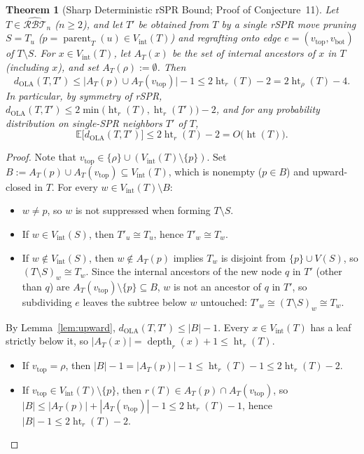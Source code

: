 \documentclass[11pt]{article}
\newtheorem{theorem}{Theorem}
\theoremstyle{definition}
\theoremstyle{remark}
\DeclareMathOperator{\htr}{ht}
\DeclareMathOperator{\parent}{parent}
\DeclareMathOperator{\depth}{depth}
\begin{document}
\begin{theorem}[Sharp Deterministic rSPR Bound; Proof of Conjecture~11]\label{thm:rspr}
Let $T \in \widehat{\mathcal{RBT}}_n$ ($n \ge 2$), and let $T'$ be obtained from $T$ by a single rSPR move pruning $S = T_u$ ($p = \parent_T(u) \in V_{\mathrm{int}}(T)$) and regrafting onto edge $e = (v_{\mathrm{top}}, v_{\mathrm{bot}})$ of $T \setminus S$. For $x \in V_{\mathrm{int}}(T)$, let $A_T(x)$ be the set of internal ancestors of $x$ in $T$ (including $x$), and set $A_T(\rho) := \emptyset$. Then
\[
  d_{\mathrm{OLA}}(T, T') \le \bigl|A_T(p) \cup A_T(v_{\mathrm{top}})\bigr| - 1 \le 2\htr_r(T) - 2 = 2\htr_\rho(T) - 4.
\]
In particular, by symmetry of rSPR, $d_{\mathrm{OLA}}(T, T') \le 2\min\bigl(\htr_r(T), \htr_r(T')\bigr) - 2$, and for any probability distribution on single-SPR neighbors $T'$ of $T$,
\[
  \mathbb{E}\bigl[d_{\mathrm{OLA}}(T, T')\bigr] \le 2\htr_r(T) - 2 = O\bigl(\htr(T)\bigr).
\]
\end{theorem}

\begin{proof}
Note that $v_{\mathrm{top}} \in \{\rho\} \cup (V_{\mathrm{int}}(T) \setminus \{p\})$. Set $B := A_T(p) \cup A_T(v_{\mathrm{top}}) \subseteq V_{\mathrm{int}}(T)$, which is nonempty ($p \in B$) and upward-closed in $T$. For every $w \in V_{\mathrm{int}}(T) \setminus B$:
\begin{itemize}[leftmargin=2em,itemsep=2pt]
  \item $w \neq p$, so $w$ is not suppressed when forming $T \setminus S$.
  \item If $w \in V_{\mathrm{int}}(S)$, then $T'_u \cong T_u$, hence $T'_w \cong T_w$.
  \item If $w \notin V_{\mathrm{int}}(S)$, then $w \notin A_T(p)$ implies $T_w$ is disjoint from $\{p\} \cup V(S)$, so $(T \setminus S)_w \cong T_w$. Since the internal ancestors of the new node $q$ in $T'$ (other than $q$) are $A_T(v_{\mathrm{top}}) \setminus \{p\} \subseteq B$, $w$ is not an ancestor of $q$ in $T'$, so subdividing $e$ leaves the subtree below $w$ untouched: $T'_w \cong (T \setminus S)_w \cong T_w$.
\end{itemize}
By Lemma~\ref{lem:upward}, $d_{\mathrm{OLA}}(T, T') \le |B| - 1$. Every $x \in V_{\mathrm{int}}(T)$ has a leaf strictly below it, so $|A_T(x)| = \depth_r(x) + 1 \le \htr_r(T)$.
\begin{itemize}[leftmargin=2em,itemsep=2pt]
  \item If $v_{\mathrm{top}} = \rho$, then $|B| - 1 = |A_T(p)| - 1 \le \htr_r(T) - 1 \le 2\htr_r(T) - 2$.
  \item If $v_{\mathrm{top}} \in V_{\mathrm{int}}(T) \setminus \{p\}$, then $r(T) \in A_T(p) \cap A_T(v_{\mathrm{top}})$, so $|B| \le |A_T(p)| + |A_T(v_{\mathrm{top}})| - 1 \le 2\htr_r(T) - 1$, hence $|B| - 1 \le 2\htr_r(T) - 2$.
\end{itemize}
\end{proof}
\end{document}
